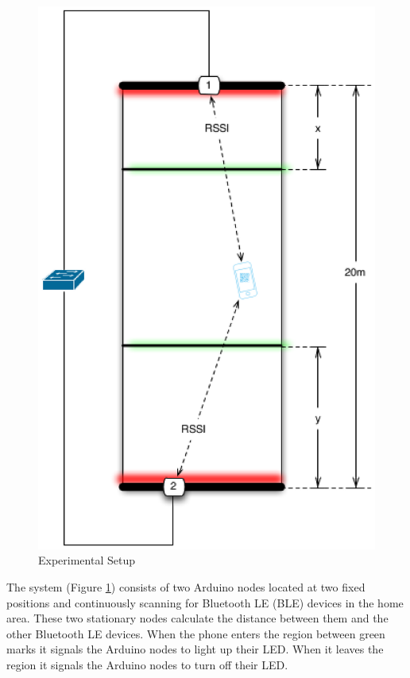 \documentclass[conference,a4paper]{../../sty/IEEEtran}
\begin{document}
\begin{figure}[h!]
\centering
\includegraphics[scale=0.5]{position.eps}
\caption{Experimental Setup}
\label{fig1}
\end{figure}

The system (Figure \ref{fig1}) consists of two Arduino nodes located at two fixed positions and continuously scanning for Bluetooth LE (BLE) devices in the home area. These two stationary nodes calculate the distance between them and the other Bluetooth LE devices.
When the phone enters the region between green marks it signals the Arduino nodes to light up their LED.
When it leaves the region it signals the Arduino nodes to turn off their LED.
\end{document}
